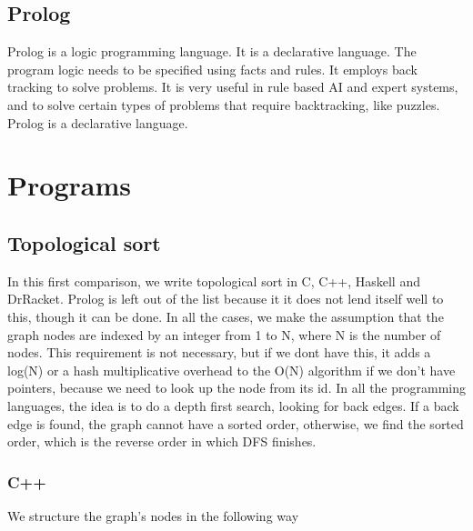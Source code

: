 \subsection{Prolog}
Prolog is a logic programming language. It is a declarative language. The 
program logic needs to be specified using facts and rules. It employs back 
tracking to solve problems. It is very useful in rule based AI and expert 
systems, and to solve certain types of problems that require backtracking, 
like puzzles. Prolog is a declarative language. 

\section{Programs}
\subsection{Topological sort}
In this first comparison, we write topological sort in C, C++, Haskell and 
DrRacket. Prolog is left out of the list because it it does not lend itself 
well to this, though it can be done. In all the cases, we make the assumption
that the graph nodes are indexed by an integer from 1 to N, where N is the 
number of nodes. This requirement is not necessary, but if we dont have this,
it adds a log(N) or a hash  multiplicative overhead to the O(N) algorithm if
we don't have pointers, because we need to look up the node from its id. In
all the programming languages, the idea is to do a depth first search, 
looking for back edges. If a back edge is found, the graph cannot have a 
sorted order, otherwise, we find the sorted order, which is the reverse 
order in which DFS finishes. 
\subsubsection{C++}
We structure the graph's nodes in the following way


